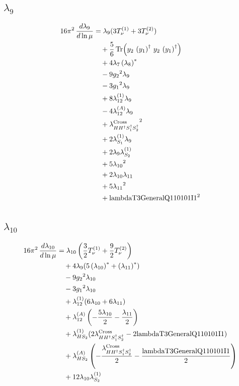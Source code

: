 \documentclass[10pt,a4paper]{article}
\begin{document}
\subsection*{$\lambda_{9}$}
\begin{align*}
16\pi^2\,\frac{d \lambda_{9}}{d\ln\mu} &={\lambda_{9}} (3 T_{\nu}^{(1)}+3 T_{\nu}^{(2)}) \\
&\quad +\frac{5}{6} \operatorname{Tr}\!\left({y_2}\,\left({y_1}\right)^{\dagger}\,{y_2}\,\left({y_1}\right)^{\dagger}\right) \\
&\quad +4 {\lambda_{7}} \left({\lambda_{8}}\right)^{*} \\
&\quad -9 {g_2}^2 {\lambda_{9}} \\
&\quad -3 {g_1}^2 {\lambda_{9}} \\
&\quad +8 {\lambda_{12}^{(1)}} {\lambda_{9}} \\
&\quad -4 {\lambda_{12}^{(A)}} {\lambda_{9}} \\
&\quad +{\lambda_{H H^\dagger S_1^\dagger S_2^\dagger}^{\rm Cross}}^2 \\
&\quad +2 {\lambda_{S_1}^{(1)}} {\lambda_{9}} \\
&\quad +2 {\lambda_{9}} {\lambda_{S_2}^{(1)}} \\
&\quad +5 {\lambda_{10}}^2 \\
&\quad +2 {\lambda_{10}} {\lambda_{11}} \\
&\quad +5 {\lambda_{11}}^2 \\
&\quad +\text{lambdaT3GeneralQ110101I1}^2 \\
\end{align*}
\subsection*{$\lambda_{10}$}
\begin{align*}
16\pi^2\,\frac{d \lambda_{10}}{d\ln\mu} &={\lambda_{10}} \left(\frac{3}{2} T_{\nu}^{(1)}+\frac{9}{2} T_{\nu}^{(2)}\right) \\
&\quad +4 {\lambda_{9}} (5 \left({\lambda_{10}}\right)^{*}+\left({\lambda_{11}}\right)^{*}) \\
&\quad -9 {g_2}^2 {\lambda_{10}} \\
&\quad -3 {g_1}^2 {\lambda_{10}} \\
&\quad +{\lambda_{12}^{(1)}} (6 {\lambda_{10}}+6 {\lambda_{11}}) \\
&\quad +{\lambda_{12}^{(A)}} \left(-\frac{5 {\lambda_{10}}}{2}-\frac{{\lambda_{11}}}{2}\right) \\
&\quad +{\lambda_{HS_2}^{(1)}} (2 {\lambda_{H H^\dagger S_1^\dagger S_2^\dagger}^{\rm Cross}}-2 \text{lambdaT3GeneralQ110101I1}) \\
&\quad +{\lambda_{HS_2}^{(A)}} \left(-\frac{{\lambda_{H H^\dagger S_1^\dagger S_2^\dagger}^{\rm Cross}}}{2}-\frac{\text{lambdaT3GeneralQ110101I1}}{2}\right) \\
&\quad +12 {\lambda_{10}} {\lambda_{S_2}^{(1)}} \\
\end{align*}
\end{document}
